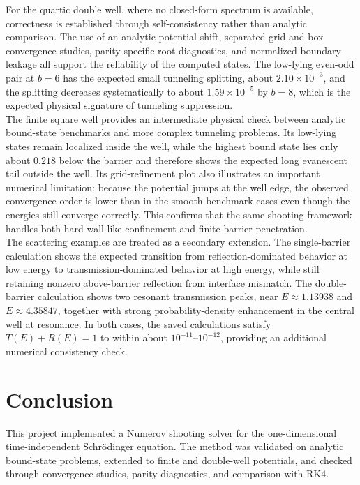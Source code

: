 \documentclass[11pt]{article}
\begin{document}
\begin{refsection}
        For the quartic double well, where no closed-form spectrum is available, correctness is established through self-consistency rather than analytic comparison. The use of an analytic potential shift, separated grid and box convergence studies, parity-specific root diagnostics, and normalized boundary leakage all support the reliability of the computed states. The low-lying even-odd pair at $b=6$ has the expected small tunneling splitting, about $2.10\times10^{-3}$, and the splitting decreases systematically to about $1.59\times10^{-5}$ by $b=8$, which is the expected physical signature of tunneling suppression. \\

        The finite square well provides an intermediate physical check between analytic bound-state benchmarks and more complex tunneling problems. Its low-lying states remain localized inside the well, while the highest bound state lies only about $0.218$ below the barrier and therefore shows the expected long evanescent tail outside the well. Its grid-refinement plot also illustrates an important numerical limitation: because the potential jumps at the well edge, the observed convergence order is lower than in the smooth benchmark cases even though the energies still converge correctly. This confirms that the same shooting framework handles both hard-wall-like confinement and finite barrier penetration. \\

        The scattering examples are treated as a secondary extension. The single-barrier calculation shows the expected transition from reflection-dominated behavior at low energy to transmission-dominated behavior at high energy, while still retaining nonzero above-barrier reflection from interface mismatch. The double-barrier calculation shows two resonant transmission peaks, near $E\approx1.13938$ and $E\approx4.35847$, together with strong probability-density enhancement in the central well at resonance. In both cases, the saved calculations satisfy $T(E)+R(E)=1$ to within about $10^{-11}$--$10^{-12}$, providing an additional numerical consistency check. \\

    \section{Conclusion}
        This project implemented a Numerov shooting solver for the one-dimensional time-independent Schr\"odinger equation. The method was validated on analytic bound-state problems, extended to finite and double-well potentials, and checked through convergence studies, parity diagnostics, and comparison with RK4. \\


\end{refsection}
\end{document}
